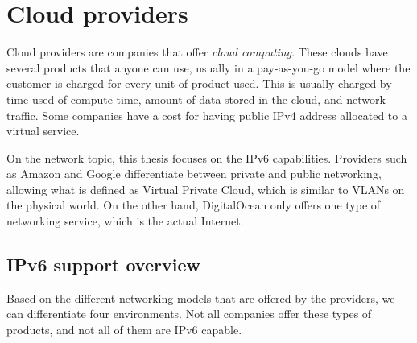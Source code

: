 \chapter{Cloud providers}

Cloud providers are companies that offer \textit{cloud computing}. These clouds have several products that anyone can use, usually in a pay-as-you-go model where the customer is charged for every unit of product used. This is usually charged by time used of compute time, amount of data stored in the cloud, and network traffic. Some companies have a cost for having public IPv4 address allocated to a virtual service.

On the network topic, this thesis focuses on the IPv6 capabilities. Providers such as Amazon and Google differentiate between private and public networking, allowing what is defined as Virtual Private Cloud, which is similar to VLANs on the physical world. On the other hand, DigitalOcean only offers one type of networking service, which is the actual Internet.


\section{IPv6 support overview}

Based on the different networking models that are offered by the providers, we can differentiate four environments. Not all companies offer these types of products, and not all of them are IPv6 capable.

